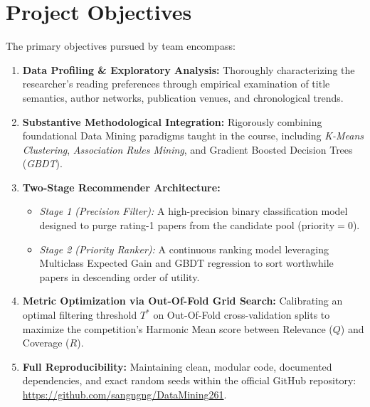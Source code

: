 \section{Project Objectives}
The primary objectives pursued by team \textbf{\TeamName} encompass:
\begin{enumerate}
  \item \textbf{Data Profiling \& Exploratory Analysis:} Thoroughly characterizing the researcher's reading preferences through empirical examination of title semantics, author networks, publication venues, and chronological trends.
  \item \textbf{Substantive Methodological Integration:} Rigorously combining foundational Data Mining paradigms taught in the course, including \textit{K-Means Clustering}, \textit{Association Rules Mining}, and Gradient Boosted Decision Trees (\textit{GBDT}).
  \item \textbf{Two-Stage Recommender Architecture:}
    \begin{itemize}
      \item \textit{Stage 1 (Precision Filter):} A high-precision binary classification model designed to purge rating-1 papers from the candidate pool ($\text{priority} = 0$).
      \item \textit{Stage 2 (Priority Ranker):} A continuous ranking model leveraging Multiclass Expected Gain and GBDT regression to sort worthwhile papers in descending order of utility.
    \end{itemize}
  \item \textbf{Metric Optimization via Out-Of-Fold Grid Search:} Calibrating an optimal filtering threshold $T^*$ on Out-Of-Fold cross-validation splits to maximize the competition's Harmonic Mean score between Relevance ($Q$) and Coverage ($R$).
  \item \textbf{Full Reproducibility:} Maintaining clean, modular code, documented dependencies, and exact random seeds within the official GitHub repository: \url{https://github.com/sangngng/DataMining261}.
\end{enumerate}

